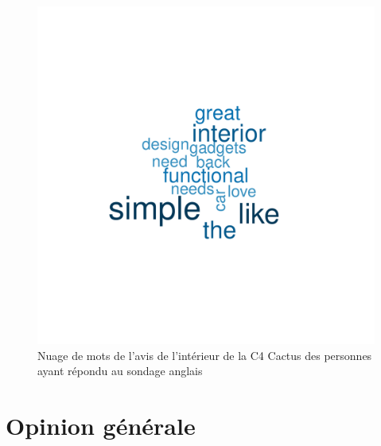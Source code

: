 \documentclass[12pt]{article}\usepackage[]{graphicx}\usepackage[]{color}
\makeatletter
\def\maxwidth{ %
  \ifdim\Gin@nat@width>\linewidth
    \linewidth
  \else
    \Gin@nat@width
  \fi
}
\newenvironment{knitrout}{}{} %
\makeatother
\begin{document}
\begin{knitrout}
\color{fgcolor}\begin{figure}[H]
\includegraphics[width=\maxwidth]{figure/interior_en-1} \caption[Nuage de mots de l'avis de l'intérieur de la C4 Cactus des personnes ayant répondu au sondage anglais]{Nuage de mots de l'avis de l'intérieur de la C4 Cactus des personnes ayant répondu au sondage anglais}\label{fig:interior en}
\end{figure}


\end{knitrout}

\section{Opinion générale}
\end{document}
